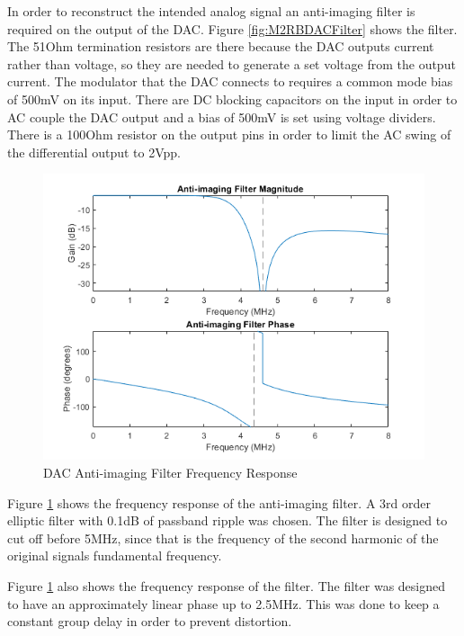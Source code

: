 \documentclass[crop=false]{standalone}
\begin{document}
        In order to reconstruct the intended analog signal an anti-imaging filter is required on the output of the DAC. Figure \ref{fig:M2RBDACFilter} shows the filter. The 51Ohm termination resistors are there because the DAC outputs current rather than voltage, so they are needed to generate a set voltage from the output current. The modulator that the DAC connects to requires a common mode bias of 500mV on its input. There are DC blocking capacitors on the input in order to AC couple the DAC output and a bias of 500mV is set using voltage dividers. There is a 100Ohm resistor on the output pins in order to limit the AC swing of the differential output to 2Vpp.
        
        \begin{figure}[H]
            \centering
            \includegraphics[width=\textwidth]{M2RBImagingFilter.png}
            \caption{DAC Anti-imaging Filter Frequency Response}
            \label{fig:M2RBFilterResponse}
        \end{figure}
        
        Figure \ref{fig:M2RBFilterResponse} shows the frequency response of the anti-imaging filter. A 3rd order elliptic filter with 0.1dB of passband ripple was chosen. The filter is designed to cut off before 5MHz, since that is the frequency of the second harmonic of the original signals fundamental frequency.
        
        Figure \ref{fig:M2RBFilterResponse} also shows the frequency response of the filter. The filter was designed to have an approximately linear phase up to 2.5MHz. This was done to keep a constant group delay in order to prevent distortion.
        
\end{document}
